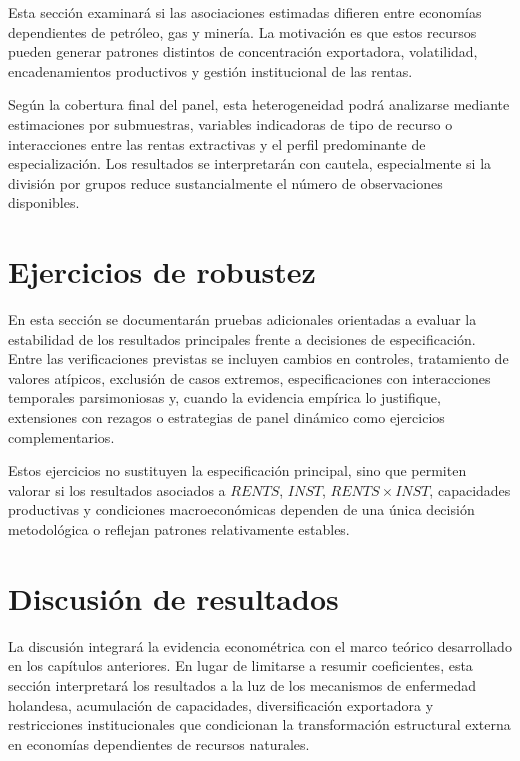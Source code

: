 \documentclass[../../PTFM.tex]{subfiles}
\begin{document}
	Esta sección examinará si las asociaciones estimadas difieren entre economías dependientes de petróleo, gas y minería. La motivación es que estos recursos pueden generar patrones distintos de concentración exportadora, volatilidad, encadenamientos productivos y gestión institucional de las rentas.

	Según la cobertura final del panel, esta heterogeneidad podrá analizarse mediante estimaciones por submuestras, variables indicadoras de tipo de recurso o interacciones entre las rentas extractivas y el perfil predominante de especialización. Los resultados se interpretarán con cautela, especialmente si la división por grupos reduce sustancialmente el número de observaciones disponibles.
	

	\section{Ejercicios de robustez}
	\label{sec:robustez}

	En esta sección se documentarán pruebas adicionales orientadas a evaluar la estabilidad de los resultados principales frente a decisiones de especificación. Entre las verificaciones previstas se incluyen cambios en controles, tratamiento de valores atípicos, exclusión de casos extremos, especificaciones con interacciones temporales parsimoniosas y, cuando la evidencia empírica lo justifique, extensiones con rezagos o estrategias de panel dinámico como ejercicios complementarios.

	Estos ejercicios no sustituyen la especificación principal, sino que permiten valorar si los resultados asociados a $RENTS$, $INST$, $RENTS \times INST$, capacidades productivas y condiciones macroeconómicas dependen de una única decisión metodológica o reflejan patrones relativamente estables.


	\section{Discusión de resultados}
	\label{sec:discusion-resultados}

	La discusión integrará la evidencia econométrica con el marco teórico desarrollado en los capítulos anteriores. En lugar de limitarse a resumir coeficientes, esta sección interpretará los resultados a la luz de los mecanismos de enfermedad holandesa, acumulación de capacidades, diversificación exportadora y restricciones institucionales que condicionan la transformación estructural externa en economías dependientes de recursos naturales.
\end{document}
